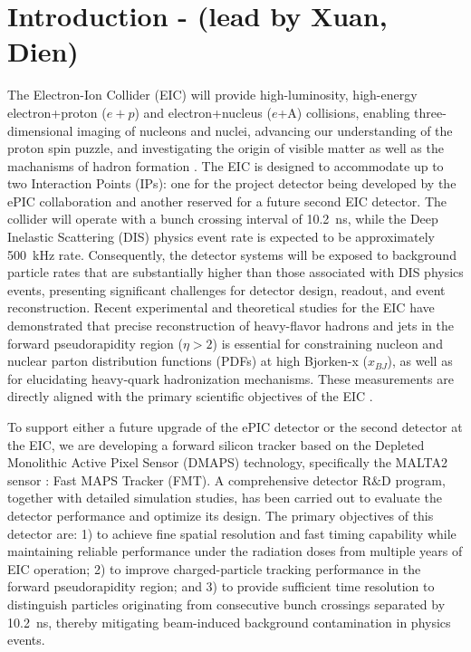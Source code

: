 \documentclass[pdftex,twocolumn,epjc3]{svjour3}          %
\begin{document}
\begin{abstract}
Insert your abstract here. Insert your abstract here. Insert your abstract here.
Insert your abstract here. Insert your abstract here. Insert your abstract here.
Insert your abstract here. Insert your abstract here. Insert your abstract here.
\end{abstract}

\section{Introduction - (lead by Xuan, Dien)}\label{sec:intro}

The Electron-Ion Collider (EIC) will provide high-luminosity, high-energy electron+proton ($e+p$) and electron+nucleus ($e$+A) collisions, enabling three-dimensional imaging of nucleons and nuclei, advancing our understanding of the proton spin puzzle, and investigating the origin of visible matter as well as the machanisms of hadron formation \cite{Abdul_Khalek_2022}. The EIC is designed to accommodate up to two Interaction Points (IPs): one for the project detector being developed by the ePIC collaboration and another reserved for a future second EIC detector. The collider will operate with a bunch crossing interval of 10.2~ns, while the Deep Inelastic Scattering (DIS) physics event rate is expected to be approximately 500~kHz rate. Consequently, the detector systems will be exposed to background particle rates that are substantially higher than those associated with DIS physics events, presenting significant challenges for detector design, readout, and event reconstruction. Recent experimental and theoretical studies for the EIC \cite{Li:2020sru, Li:2021xig, Li:2025lxr, Li:2020zbk, PhysRevLett.126.252001, PhysRevD.104.114039} have demonstrated that precise reconstruction of heavy-flavor hadrons and jets in the forward pseudorapidity region ($\eta > 2$) is essential for constraining nucleon and nuclear parton distribution functions (PDFs) at high Bjorken-x ($x_{BJ}$), as well as for elucidating heavy-quark hadronization mechanisms. These measurements are directly aligned with the primary scientific objectives of the EIC \cite{Abdul_Khalek_2022}. 

To support either a future upgrade of the ePIC detector or the second detector at the EIC, we are developing a forward silicon tracker based on the Depleted Monolithic Active Pixel Sensor (DMAPS) technology, specifically the MALTA2 sensor \cite{MALTA2Cz}: Fast MAPS Tracker (FMT). A comprehensive detector R$\&$D program, together with detailed simulation studies, has been carried out to evaluate the detector performance and optimize its design. The primary objectives of this detector are: 1) to achieve fine spatial resolution and fast timing capability while maintaining reliable performance under the radiation doses from multiple years of EIC operation; 2) to improve charged-particle tracking performance in the forward pseudorapidity region; and 3) to provide sufficient time resolution to distinguish particles originating from consecutive bunch crossings separated by 10.2~ns, thereby mitigating beam-induced background contamination in physics events. 
\end{document}
